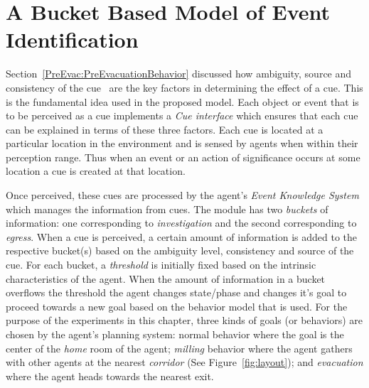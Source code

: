 
\section{A Bucket Based Model of Event Identification}
\label{PreEvac:EventIdentification}

Section~\ref{PreEvac:PreEvacuationBehavior} discussed how ambiguity, source and consistency of the cue~\cite{Kuligowski:2005tt,Sime:1983uy,Tong:1985wn} are the key factors in determining the effect of a cue. This is the fundamental idea used in the proposed model. Each object or event that is to be perceived as a cue implements a \emph{Cue interface} which ensures that each cue can be explained in terms of these three factors. Each cue is located at a particular location in the environment and is sensed by agents when within their perception range. Thus when an event or an action of significance occurs at some location a cue is created at that location.


Once perceived, these cues are processed by the agent's \emph{Event Knowledge System} which manages the information from cues. The  module has two \emph{buckets} of information: one corresponding to \emph{investigation} and the second corresponding to \emph{egress}. When a cue is perceived, a certain amount of information is added to the respective bucket(s) based on the ambiguity level, consistency and source of the cue.  For each bucket, a \emph{threshold} is initially fixed  based on the intrinsic characteristics of the agent. When the amount of information in a bucket overflows the threshold the agent changes state/phase and changes it's goal to proceed towards a new goal based on the behavior model that is used. For the purpose of the experiments in this chapter, three kinds of goals (or behaviors) are chosen by the agent's planning system: normal behavior where the goal is the center of the \emph{home} room of the agent; \emph{milling} behavior where the agent gathers with other agents at the nearest \emph{corridor} (See Figure~\ref{fig:layout}); and \emph{evacuation} where the agent heads towards the nearest exit.


